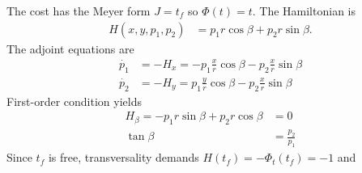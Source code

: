 \documentclass[12pt]{article}
\begin{document}
\begin{problem}[5]
The cost has the Meyer form $ J = t_f$ so  $ \Phi(t) = t$. The Hamiltonian is
\begin{align*}
	H(x,y,p_1,p_2) &= p_1 r \cos \beta + p_2 r \sin \beta .
\end{align*}
The adjoint equations are
\begin{align*}
	\dot{p_1} &= -H_x = - p_1 \frac{x}{r} \cos \beta - p_2 \frac{x}{r} \sin \beta \\
	\dot{p_2} &= -H_y = p_1 \frac{y}{r} \cos \beta - p_2 \frac{x}{r} \sin \beta 
\end{align*}
First-order condition yields
\begin{align*}
	H_{\beta} = -p_1 r \sin \beta + p_2 r \cos \beta &= 0 \\
	\tan \beta &= \frac{p_2}{p_1} 
\end{align*}
Since $ t_f$ is free, transversality demands $ H(t_f) = - \Phi_t(t_f) = -1$ and 
\end{problem}
\end{document}

